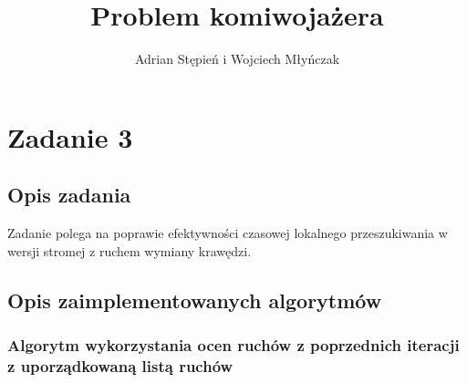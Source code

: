 \documentclass[a4paper]{article}
\title{Problem komiwojażera}
\author{Adrian Stępień i Wojciech Młyńczak}
\begin{document}
\maketitle

\section{Zadanie 3}

\subsection{Opis zadania}

Zadanie polega na poprawie efektywności czasowej lokalnego przeszukiwania w wersji stromej z ruchem wymiany krawędzi.

\subsection{Opis zaimplementowanych algorytmów}

\subsubsection{Algorytm wykorzystania ocen ruchów z poprzednich iteracji z uporządkowaną listą ruchów}
\end{document}
